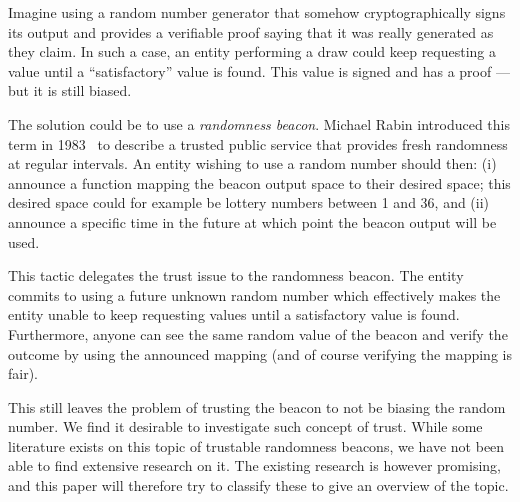 Imagine using a random number generator that somehow cryptographically signs its output and provides a verifiable proof saying that it was really generated  as they claim. In such a case, an entity performing a draw could keep requesting a value until a \enquote{satisfactory} value is found. This value is signed and has a proof --- but it is still biased.

The solution could be to use a \emph{randomness beacon}. Michael Rabin introduced this term in 1983~\cite{rabin1983transaction} to describe a trusted public service that provides fresh randomness at regular intervals. An entity wishing to use a random number should then: (i) announce a function mapping the beacon output space to their desired space; this desired space could for example be lottery numbers between 1 and 36, and (ii) announce a specific time in the future at which point the beacon output will be used.

This tactic delegates the trust issue to the randomness beacon. The entity commits to using a future unknown random number which effectively makes the entity unable to keep requesting values until a satisfactory value is found. Furthermore, anyone can see the same random value of the beacon and verify the outcome by using the announced mapping (and of course verifying the mapping is fair).

This still leaves the problem of trusting the beacon to not be biasing the random number. We find it desirable to investigate such concept of trust. While some literature exists on this topic of trustable randomness beacons, we have not been able to find extensive research on it. The existing research is however promising, and this paper will therefore try to classify these to give an overview of the topic.

